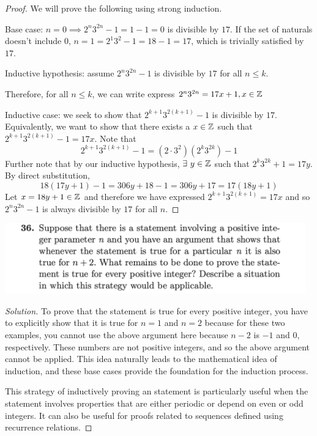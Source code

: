 \documentclass[12pt]{scrartcl}
\begin{document}
\begin{proof}
  We will prove the following using strong induction. 

  Base case: $n = 0 \implies 2^n3^{2n} - 1 = 1 - 1 = 0$ is divisible by $17$. If the set of naturals doesn't include $0$, $n = 1 = 2^1 3^{2} - 1 = 18 - 1 = 17$, which is trivially satisfied by $17$. 

  \hfill
  
  Inductive hypothesis: assume $2^n 3^{2n} - 1$ is divisible by $17$ for all $n \leq k$.

  Therefore, for all $n \leq k$, we can write express $2^n 3^{2n} = 17x + 1, x \in \mathbb Z$

  \hfill
  
  Inductive case: we seek to show that $2^{k+1} 3^{2(k+1)} - 1$ is divisible by $17$. Equivalently, we want to show 
  that there exists a $x \in \mathbb Z$ such that $2^{k+1} 3^{2(k+1)}  - 1 = 17x$. Note that
  \[2^{k+1} 3^{2(k+1)} - 1 = (2 \cdot 3^2)(2^k 3^{2k}) - 1\]
  Further note that by our inductive hypothesis, $\exists \ y \in \mathbb Z$ such that $2^k 3^{2k} + 1 = 17y$. By direct 
  substitution, 
  \[18(17y + 1) - 1 = 306y + 18 - 1 = 306y + 17 = 17(18y + 1)\]
  Let $x = 18y + 1 \in \mathbb Z$ and therefore we have expressed $2^{k+1} 3^{2(k+1)} = 17x$ and so 
  $2^n3^{2n} - 1$ is always divisible by $17$ for all $n$. 
\end{proof}

\newpage 

\includegraphics[width=13cm]{36.png}

\begin{proof}[Solution]
  To prove that the statement is true for every positive integer, you have to explicitly show that 
  it is true for $n = 1$ and $n = 2$ because for these two examples, you cannot use the above argument here 
  because $n - 2$ is $-1$ and $0$, respectively. These numbers are not positive integers, and 
  so the above argument cannot be applied. This idea naturally leads to the mathematical idea of induction, and these 
  base cases provide the foundation for the induction process.

  \hfill

  This strategy of inductively proving an statement is particularly useful when the statement involves 
  properties that are either periodic or depend on even or odd integers. It can also be 
  useful for proofs related to sequences defined using recurrence relations. 
\end{proof}
\end{document}
